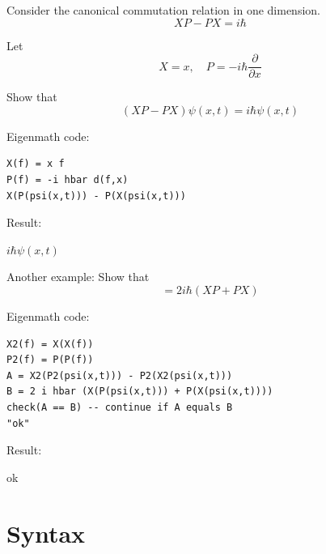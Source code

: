 \documentclass[12pt]{article}
\begin{document}
Consider the canonical commutation relation in one dimension.
\begin{equation*}
XP-PX=i\hbar
\end{equation*}

Let
\begin{equation*}
X=x,\quad P=-i\hbar\frac{\partial}{\partial x}
\end{equation*}

Show that
\begin{equation*}
(XP-PX)\psi(x,t)=i\hbar\psi(x,t)
\end{equation*}

Eigenmath code:
{\color{blue}
\begin{verbatim}
X(f) = x f
P(f) = -i hbar d(f,x)
X(P(psi(x,t))) - P(X(psi(x,t)))
\end{verbatim}}

Result:

\bigskip
$i\hbar\psi(x,t)$

\bigskip
Another example: Show that
\begin{equation*}
[X^2,P^2]=2i\hbar(XP+PX)
\end{equation*}

Eigenmath code:
{\color{blue}
\begin{verbatim}
X2(f) = X(X(f))
P2(f) = P(P(f))
A = X2(P2(psi(x,t))) - P2(X2(psi(x,t)))
B = 2 i hbar (X(P(psi(x,t))) + P(X(psi(x,t))))
check(A == B) -- continue if A equals B
"ok"
\end{verbatim}}

Result:

\bigskip
ok

\newpage

\section{Syntax}
\end{document}
